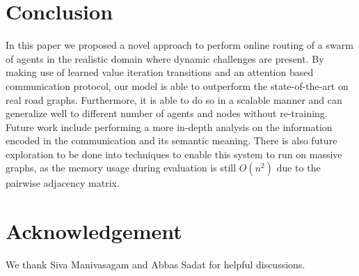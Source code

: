 \vspace{-0.1in}
\section{Conclusion}

In this paper we proposed a novel approach to perform online routing of a swarm of agents in the
realistic domain where dynamic challenges are present. By making use of learned value iteration
transitions and an attention based communication protocol, our model is able to outperform the
state-of-the-art on real road graphs. Furthermore, it is able to do so in a scalable manner and can generalize well to different number of agents and nodes without re-training.
Future work include performing a more in-depth analysis on the
information encoded in the communication and its semantic meaning.
There is also future exploration to be done into techniques to enable this system to run on massive
graphs, as the
memory usage during evaluation is still $O(n^2)$ due to the pairwise adjacency matrix.

\section*{Acknowledgement} We thank Siva Manivasagam and Abbas Sadat for helpful discussions.
